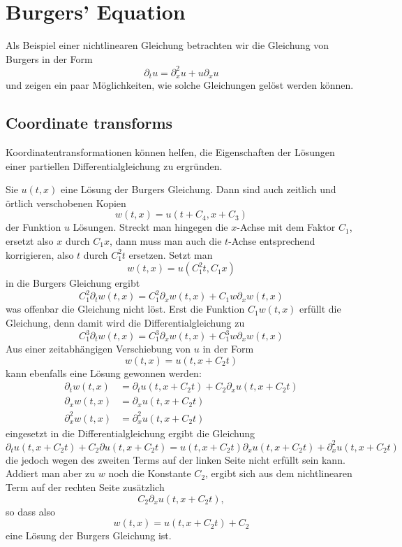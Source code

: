 %
%
%
\section{Burgers' Equation\label{burgers}}
Als Beispiel einer nichtlinearen Gleichung betrachten wir die Gleichung
von Burgers in der Form
\[
\partial_t u=\partial_x^2u+u\partial_xu
\]
und zeigen ein paar Möglichkeiten, wie solche Gleichungen
gelöst werden können.

\subsection{Coordinate transforms}
Koordinatentransformationen können helfen, die Eigenschaften der
Lösungen einer partiellen Differentialgleichung zu ergründen.

Sie $u(t,x)$ eine Lösung der Burgers Gleichung. Dann sind auch
zeitlich und örtlich verschobenen Kopien
\[
w(t,x)=u(t+C_4, x+C_3)
\]
der Funktion $u$ Lösungen.
Streckt man hingegen die $x$-Achse mit dem Faktor $C_1$, ersetzt
also $x$ durch $C_1x$, dann
muss man auch die $t$-Achse entsprechend korrigieren, also $t$
durch $C_1^2t$ ersetzen. Setzt man
\[
w(t,x)=u(C_1^2t,C_1x)
\]
in die Burgers Gleichung ergibt
\[
C_1^2\partial_t w(t,x)=C_1^2\partial_xw(t,x)+C_1w\partial_xw(t,x)
\]
was offenbar die Gleichung nicht löst. Erst die Funktion $C_1w(t,x)$
erfüllt die Gleichung, denn damit wird die Differentialgleichung zu
\[
C_1^3\partial_t w(t,x)=C_1^3\partial_xw(t,x)+C_1^3w\partial_xw(t,x)
\]
Aus einer zeitabhängigen Verschiebung von $u$ in der Form
\[
w(t,x)=u(t,x+C_2t)
\]
kann ebenfalls eine Lösung gewonnen werden:
\begin{align*}
\partial_t w(t,x)&=\partial_t u(t,x+C_2t)+C_2\partial_x u(t,x+C_2t)
\\
\partial_x w(t,x)&=\partial_x u(t,x+C_2t)
\\
\partial_x^2 w(t,x)&=\partial_x^2 u(t,x+C_2t)
\end{align*}
eingesetzt in die Differentialgleichung ergibt die Gleichung
\[
\partial_t u(t,x+C_2t)+C_2\partial u(t,x+C_2t)
=
u(t,x+C_2t)\partial_xu(t,x+C_2t)
+
\partial_x^2 u(t,x+C_2t)
\]
die jedoch wegen des zweiten Terms auf der linken Seite nicht erfüllt
sein kann. Addiert man aber zu $w$ noch die Konstante $C_2$, ergibt sich
aus dem nichtlinearen Term auf der rechten Seite zusätzlich
\[
C_2\partial_xu(t,x+C_2t),
\]
so dass also
\[
w(t,x)=u(t,x+C_2t)+C_2
\]
eine Lösung der Burgers Gleichung ist.

